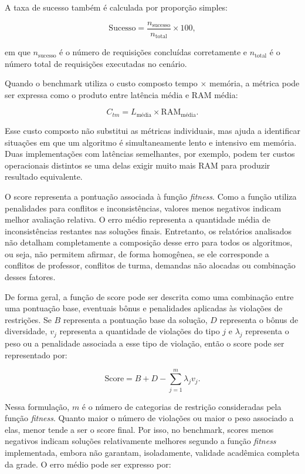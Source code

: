 A taxa de sucesso também é calculada por proporção simples:

\begin{equation}
\text{Sucesso} = \frac{n_{\text{sucesso}}}{n_{\text{total}}}\times 100,
\end{equation}

em que \(n_{\text{sucesso}}\) é o número de requisições concluídas corretamente e \(n_{\text{total}}\) é o número total de requisições executadas no cenário.

Quando o benchmark utiliza o custo composto tempo \(\times\) memória, a métrica pode ser expressa como o produto entre latência média e RAM média:

\begin{equation}
C_{tm} = L_{\text{média}}\times \text{RAM}_{\text{média}}.
\end{equation}

Esse custo composto não substitui as métricas individuais, mas ajuda a identificar situações em que um algoritmo é simultaneamente lento e intensivo em memória. Duas implementações com latências semelhantes, por exemplo, podem ter custos operacionais distintos se uma delas exigir muito mais RAM para produzir resultado equivalente.

O score representa a pontuação associada à função \textit{fitness}. Como a função utiliza penalidades para conflitos e inconsistências, valores menos negativos indicam melhor avaliação relativa. O erro médio representa a quantidade média de inconsistências restantes nas soluções finais. Entretanto, os relatórios analisados não detalham completamente a composição desse erro para todos os algoritmos, ou seja, não permitem afirmar, de forma homogênea, se ele corresponde a conflitos de professor, conflitos de turma, demandas não alocadas ou combinação desses fatores.

De forma geral, a função de score pode ser descrita como uma combinação entre uma pontuação base, eventuais bônus e penalidades aplicadas às violações de restrições. Se \(B\) representa a pontuação base da solução, \(D\) representa o bônus de diversidade, \(v_j\) representa a quantidade de violações do tipo \(j\) e \(\lambda_j\) representa o peso ou a penalidade associada a esse tipo de violação, então o score pode ser representado por:

\begin{equation}
\text{Score} = B + D - \sum_{j=1}^{m}\lambda_j v_j.
\end{equation}

Nessa formulação, \(m\) é o número de categorias de restrição consideradas pela função \textit{fitness}. Quanto maior o número de violações ou maior o peso associado a elas, menor tende a ser o score final. Por isso, no benchmark, scores menos negativos indicam soluções relativamente melhores segundo a função \textit{fitness} implementada, embora não garantam, isoladamente, validade acadêmica completa da grade. O erro médio pode ser expresso por:

